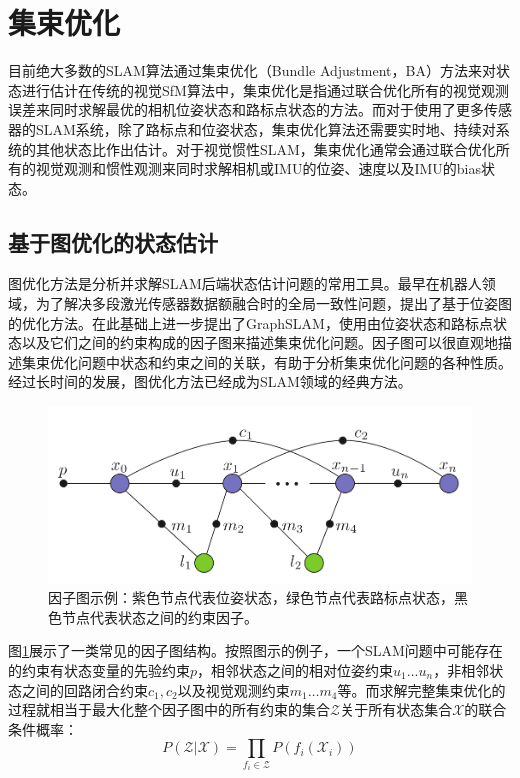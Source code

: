 \section{集束优化}

目前绝大多数的SLAM算法通过集束优化\citep{triggs1999bundle}（Bundle Adjustment，BA）方法来对状态进行估计在传统的视觉SfM算法中，集束优化是指通过联合优化所有的视觉观测误差来同时求解最优的相机位姿状态和路标点状态的方法。而对于使用了更多传感器的SLAM系统，除了路标点和位姿状态，集束优化算法还需要实时地、持续对系统的其他状态比作出估计。对于视觉惯性SLAM，集束优化通常会通过联合优化所有的视觉观测和惯性观测来同时求解相机或IMU的位姿、速度以及IMU的bias状态。

\subsection{基于图优化的状态估计}

图优化方法是分析并求解SLAM后端状态估计问题的常用工具。最早在机器人领域，为了解决多段激光传感器数据额融合时的全局一致性问题，\citep{lu1997globally,lu1997robot}提出了基于位姿图的优化方法。\citeauthor{thrun2006graph}在此基础上进一步提出了GraphSLAM\citep{thrun2006graph}，使用由位姿状态和路标点状态以及它们之间的约束构成的因子图来描述集束优化问题。因子图可以很直观地描述集束优化问题中状态和约束之间的关联，有助于分析集束优化问题的各种性质。经过长时间的发展，图优化方法已经成为SLAM领域的经典方法。

\begin{figure}[htbp]
    \centering
    \includegraphics[width=.6\textwidth]{figs/factor_graph.png}
    \caption{因子图示例\citep{kaess2012isam2}：紫色节点代表位姿状态，绿色节点代表路标点状态，黑色节点代表状态之间的约束因子。}
    \label{fig:factor_graph}
\end{figure}

图\ref{fig:factor_graph}展示了一类常见的因子图结构。按照图示的例子，一个SLAM问题中可能存在的约束有状态变量的先验约束$p$，相邻状态之间的相对位姿约束$u_1 \dots u_n$，非相邻状态之间的回路闭合约束$c_1,c_2$以及视觉观测约束$m_1 \dots m_4$等。而求解完整集束优化的过程就相当于最大化整个因子图中的所有约束的集合$\mathcal{Z}$关于所有状态集合$\mathcal{X}$的联合条件概率：
\begin{equation}
    P(\mathcal{Z}|\mathcal{X}) = \prod_{f_i\in\mathcal{Z}} P(f_i(\mathcal{X}_i))
\end{equation}

